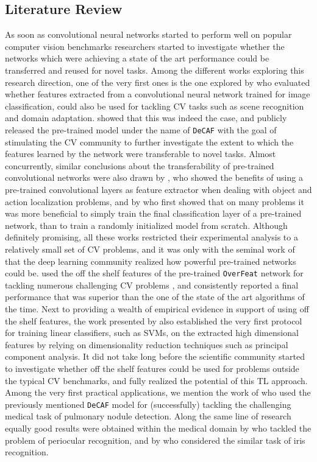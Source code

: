 \subsection{Literature Review}
As soon as convolutional neural networks started to perform well on popular computer vision benchmarks researchers started to investigate whether the networks which were achieving a state of the art performance could be transferred and reused for novel tasks. Among the different works exploring this research direction, one of the very first ones is the one explored by \citet{donahue2014decaf} who evaluated whether features extracted from a convolutional neural network trained for image classification, could also be used for tackling CV tasks such as scene recognition and domain adaptation. \citet{donahue2014decaf} showed that this was indeed the case, and publicly released the pre-trained model under the name of \texttt{DeCAF} with the goal of stimulating the CV community to further investigate the extent to which the features learned by the network were transferable to novel tasks. Almost concurrently, similar conclusions about the transferability of pre-trained convolutional networks were also drawn by \citet{oquab2014learning}, who showed the benefits of using a pre-trained convolutional layers as feature extractor when dealing with object and action localization problems, and by \citet{zeiler2014visualizing} who first showed that on many problems it was more beneficial to simply train the final classification layer of a pre-trained network, than to train a randomly initialized model from scratch. Although definitely promising, all these works restricted their experimental analysis to a relatively small set of CV problems, and it was only with the seminal work of \citet{sharif2014cnn} that the deep learning community realized how powerful pre-trained networks could be. \citet{sharif2014cnn} used the off the shelf features of the pre-trained \texttt{OverFeat} network \cite{sermanet2013overfeat} for tackling numerous challenging CV problems , and consistently reported a final performance that was superior than the one of the state of the art algorithms of the time. Next to providing a wealth of empirical evidence in support of using off the shelf features, the work presented by \citet{sharif2014cnn} also established the very first protocol for training linear classifiers, such as SVMs, on the extracted high dimensional features by relying on dimensionality reduction techniques such as principal component analysis. It did not take long before the scientific community started to investigate whether off the shelf features could be used for problems outside the typical CV benchmarks, and fully realized the potential of this TL approach. Among the very first practical applications, we mention the work of \citet{van2015off} who used the previously mentioned \texttt{DeCAF} model for (successfully) tackling the challenging medical task of pulmonary nodule detection. Along the same line of research equally good results were obtained within the medical domain by \citet{hernandez2018periocular} who tackled the problem of periocular recognition, and by \citet{nguyen2017iris} who considered the similar task of iris recognition. 


